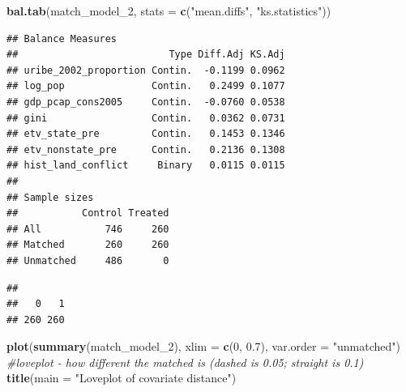 \documentclass[
]{article}
\newenvironment{Shaded}{\begin{snugshade}}{\end{snugshade}}
\newcommand{\AttributeTok}[1]{\textcolor[rgb]{0.13,0.29,0.53}{#1}}
\newcommand{\CommentTok}[1]{\textcolor[rgb]{0.56,0.35,0.01}{\textit{#1}}}
\newcommand{\DecValTok}[1]{\textcolor[rgb]{0.00,0.00,0.81}{#1}}
\newcommand{\FloatTok}[1]{\textcolor[rgb]{0.00,0.00,0.81}{#1}}
\newcommand{\FunctionTok}[1]{\textcolor[rgb]{0.13,0.29,0.53}{\textbf{#1}}}
\newcommand{\NormalTok}[1]{#1}
\newcommand{\OtherTok}[1]{\textcolor[rgb]{0.56,0.35,0.01}{#1}}
\newcommand{\SpecialCharTok}[1]{\textcolor[rgb]{0.81,0.36,0.00}{\textbf{#1}}}
\newcommand{\StringTok}[1]{\textcolor[rgb]{0.31,0.60,0.02}{#1}}
\begin{document}
\begin{Shaded}
\begin{Highlighting}[]
\FunctionTok{bal.tab}\NormalTok{(match\_model\_2, }\AttributeTok{stats =} \FunctionTok{c}\NormalTok{(}\StringTok{"mean.diffs"}\NormalTok{, }\StringTok{"ks.statistics"}\NormalTok{))}
\end{Highlighting}
\end{Shaded}

\begin{verbatim}
## Balance Measures
##                          Type Diff.Adj KS.Adj
## uribe_2002_proportion Contin.  -0.1199 0.0962
## log_pop               Contin.   0.2499 0.1077
## gdp_pcap_cons2005     Contin.  -0.0760 0.0538
## gini                  Contin.   0.0362 0.0731
## etv_state_pre         Contin.   0.1453 0.1346
## etv_nonstate_pre      Contin.   0.2136 0.1308
## hist_land_conflict     Binary   0.0115 0.0115
## 
## Sample sizes
##           Control Treated
## All           746     260
## Matched       260     260
## Unmatched     486       0
\end{verbatim}

\begin{Shaded}
\end{Shaded}

\begin{verbatim}
## 
##   0   1 
## 260 260
\end{verbatim}

\begin{Shaded}
\begin{Highlighting}[]
\FunctionTok{plot}\NormalTok{(}\FunctionTok{summary}\NormalTok{(match\_model\_2), }\AttributeTok{xlim =} \FunctionTok{c}\NormalTok{(}\DecValTok{0}\NormalTok{, }\FloatTok{0.7}\NormalTok{), }\AttributeTok{var.order =} \StringTok{"unmatched"}\NormalTok{) }\CommentTok{\#loveplot {-} how different the matched is (dashed is 0.05; straight is 0.1)}
\FunctionTok{title}\NormalTok{(}\AttributeTok{main =} \StringTok{"Loveplot of covariate distance"}\NormalTok{)}
\end{Highlighting}
\end{Shaded}
\end{document}
